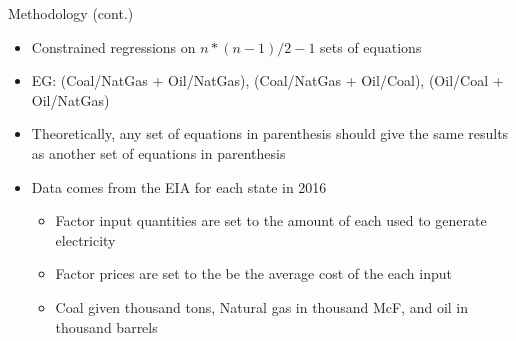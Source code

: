 \documentclass[11pt,aspectratio=169]{beamer}
\begin{document}
\begin{frame}{Methodology (cont.)}


\begin{itemize}
	
	\setlength\itemsep{1em}
	
	\item Constrained regressions on $n*(n-1)/2 -1$ sets of equations
	
	\item EG: (Coal/NatGas + Oil/NatGas), (Coal/NatGas + Oil/Coal), (Oil/Coal + Oil/NatGas)
	
	\item Theoretically, any set of equations in parenthesis should give the same results as another set of equations in parenthesis
	
	\item Data comes from the EIA for each state in 2016
	
	\begin{itemize}
		\item Factor input quantities are set to the amount of each used to generate electricity
		
		\item Factor prices are set to the be the average cost of the each input
		
		\item Coal given thousand tons, Natural gas in thousand McF, and oil in thousand barrels
	\end{itemize}
	
\end{itemize}

\end{frame}
\end{document}

